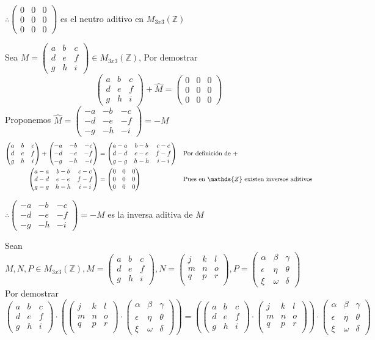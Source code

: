 \documentclass[letterpaper]{article}
\newcommand{\Ceros}{\begin{pmatrix}
		0 & 0 & 0\\
		0 & 0 & 0\\
		0 & 0 & 0 
\end{pmatrix}}
\newcommand{\Nmat}{\begin{pmatrix}
		j & k & l\\
		m & n & o\\
		q & p & r\\
\end{pmatrix}}
\newcommand{\Pmat}{\begin{pmatrix}
		\alpha & \beta & \gamma\\
		\epsilon & \eta & \theta\\
		\xi & \omega & \delta
\end{pmatrix}}
\newcommand{\Mmat}{\begin{pmatrix}
		a & b & c\\
		d & e & f\\
		g & h & i
\end{pmatrix}}
\newcommand{\mtt}{M_{3x3}(\mathds{Z})}
\newcommand{\Z}{\mathds{Z}}
\renewcommand{\*}{\cdot}
\theoremstyle{definition}
\begin{document}
\begin{center}
	$ \therefore \Ceros $ es el neutro aditivo en $ \mtt $
\end{center}
Sea $ M = \Mmat \in \mtt $, Por demostrar $$ \Mmat + \hat{M} = \Ceros $$
Proponemos $ \hat{M} = \begin{pmatrix}
-a & -b & -c\\
-d & -e & -f\\
-g & -h & -i
\end{pmatrix}  = -M$
\begin{align*}
	\Mmat + \begin{pmatrix}
	-a & -b & -c\\
	-d & -e & -f\\
	-g & -h & -i
	\end{pmatrix} & = \begin{pmatrix}
	a-a & b-b & c-c\\
	d-d & e-e & f-f\\
	g-g & h-h & i-i
	\end{pmatrix} && \text{Por definición de +}\\
	\begin{pmatrix}
	a-a & b-b & c-c\\
	d-d & e-e & f-f\\
	g-g & h-h & i-i
	\end{pmatrix} & = \Ceros &&\text{Pues en $ \Z $ existen inversos aditivos}
\end{align*}
\begin{center}
	$ \therefore \begin{pmatrix}
	-a & -b & -c\\
	-d & -e & -f\\
	-g & -h & -i
	\end{pmatrix} = -M $ es la inversa aditiva de $ M $
\end{center}
Sean $ M, N, P \in \mtt, M = \Mmat, N = \Nmat, P = \Pmat $\\
Por demostrar $ \Mmat \* \left( \Nmat \* \Pmat \right) = \left( \Mmat \* \Nmat  \right) \* \Pmat $
\end{document}
